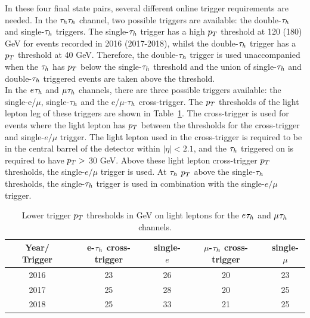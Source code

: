 In these four final state pairs, several different online trigger requirements are needed.
In the $\tau_{h}\tau_{h}$ channel, two possible triggers are available: the double-$\tau_{h}$ and single-$\tau_{h}$ triggers.
The single-$\tau_{h}$ trigger has a high $p_{T}$ threshold at 120 (180) GeV for events recorded in 2016 (2017-2018), whilst the double-$\tau_{h}$ trigger has a $p_{T}$ threshold at 40 GeV.
Therefore, the double-$\tau_{h}$ trigger is used unaccompanied when the $\tau_{h}$ has $p_{T}$ below the single-$\tau_{h}$ threshold and the union of single-$\tau_{h}$ and double-$\tau_{h}$ triggered events are taken above the threshold. \\

In the $e_{}\tau_{h}$ and $\mu_{}\tau_{h}$ channels, there are three possible triggers available: the single-e/$\mu$, single-$\tau_{h}$ and the e/$\mu$-$\tau_{h}$ cross-trigger.
The $p_{T}$ thresholds of the light lepton leg of these triggers are shown in Table~\ref{tab:trig_thresholds}.
The cross-trigger is used for events where the light lepton has $p_{T}$ between the thresholds for the cross-trigger and single-$e/\mu$ trigger.
The light lepton used in the cross-trigger is required to be in the central barrel of the detector within $|\eta| < 2.1$, and the $\tau_{h}$ triggered on is required to have $p_{T} >$ 30 GeV.
Above these light lepton cross-trigger $p_{T}$ thresholds, the single-$e/\mu$ trigger is used.
At $\tau_{h}$ $p_{T}$ above the single-$\tau_{h}$ thresholds, the single-$\tau_{h}$ trigger is used in combination with the single-$e/\mu$ trigger. \\

\begin{table}[hbtp]
  \centering
  \begin{tabular}{|c||c|c|c|c|}
    \hline
    Year/ Trigger   & e-$\tau_{h}$ cross-trigger & single-$e$ & $\mu$-$\tau_{h}$ cross-trigger & single-$\mu$ \\
    \hline
    \hline
    2016 & 23                    & 26         & 20                     & 23           \\
    2017 & 25                    & 28         & 20                     & 25           \\
    2018 & 25                    & 33         & 21                     & 25           \\
    \hline        
  \end{tabular}
  \caption{Lower trigger $p_{T}$ thresholds in GeV on light leptons for the $e_{}\tau_{h}$ and $\mu_{}\tau_{h}$ channels.}
  \label{tab:trig_thresholds}  
\end{table}

